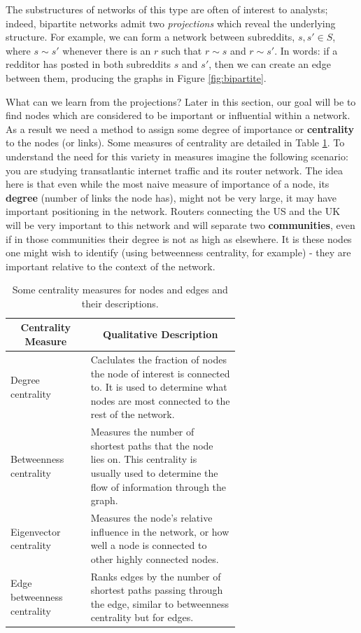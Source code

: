 \documentclass[twoside]{report}
\begin{document}
\begin{spacing}{1}
The substructures of networks of this type are often of interest to analysts; indeed, bipartite networks admit two \textit{projections} which reveal the underlying structure. For example, we can form a network between subreddits, $s, s' \in S$, where $s \sim s'$ whenever there is an $r$ such that $r \sim s$ and $r\sim s'$. In words: if a redditor has posted in both subreddits $s$ and $s'$, then we can create an edge between them, producing the graphs in Figure \ref{fig:bipartite}.

What can we learn from the projections? Later in this section, our goal will be to find nodes which are considered to be important or influential within a network. As a result we need a method to assign some degree of importance or \textbf{centrality} to the nodes (or links). Some measures of centrality are detailed in Table \ref{table:centralityMeasures}. To understand the need for this variety in measures imagine the following scenario: you are studying transatlantic internet traffic and its router network. The idea here is that even while the most naive measure of importance of a node, its \textbf{degree} (number of links the node has), might not be very large, it may have important positioning in the network. Routers connecting the US and the UK will be very important to this network and will separate two \textbf{communities}, even if in those communities their degree is not as high as elsewhere. It is these nodes one might wish to identify (using betweenness centrality, for example) - they are important relative to the context of the network.


\begin{table}[h]
\small
\centering
\begin{tabular}{|l|p{0.65\linewidth}|}
\hline
\multicolumn{1}{|c|}{\textbf{Centrality Measure}} & \multicolumn{1}{c|}{\textbf{Qualitative Description}}
\tabularnewline \hline
      Degree centrality & Caclulates the fraction of nodes the node of interest is connected to. It is used to determine what nodes are most connected to the rest of the network. \\
      \hline
      Betweenness  centrality & Measures the number of shortest paths that the node lies on. This centrality is usually used to determine the flow of information through the graph.\\
      \hline 
      Eigenvector centrality & Measures the node’s relative influence in the network, or how well a node is connected to other highly connected nodes. \\
      \hline 
      Edge betweenness centrality & Ranks edges by the number of shortest paths passing through the edge, similar to betweenness centrality but for edges.
 \tabularnewline \hline
\end{tabular}
\caption{Some centrality measures for nodes and edges and their descriptions.}
\label{table:centralityMeasures}   
\vspace{-4mm}
\end{table}


\end{spacing}
\end{document}
